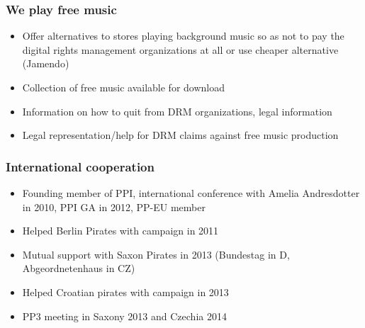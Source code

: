 \begin{frame}
	\frametitle{We play free music}
	\begin{itemize}
		\item Offer alternatives to stores playing background music so as not to pay the digital rights management organizations at all or use cheaper alternative (Jamendo)
		\item Collection of free music available for download
		\item Information on how to quit from DRM organizations, legal information
		\item Legal representation/help for DRM claims against free music production
	\end{itemize}
\end{frame}

\begin{frame}
	\frametitle{International cooperation}
	\begin{itemize}
		\item Founding member of PPI, international conference with Amelia Andresdotter in 2010, PPI GA in 2012, PP-EU member
		\item Helped Berlin Pirates with campaign in 2011
		\item Mutual support with Saxon Pirates in 2013 (Bundestag in D, Abgeordnetenhaus in CZ)
		\item Helped Croatian pirates with campaign in 2013
		\item PP3 meeting in Saxony 2013 and Czechia 2014
	\end{itemize}
\end{frame}
